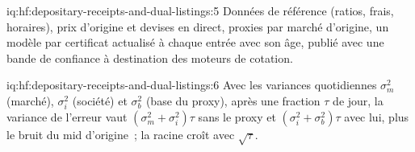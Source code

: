 \begin{solution}{iq:hf:depositary-receipts-and-dual-listings:5}
Données de référence (ratios, frais, horaires), prix d'origine et devises en direct, proxies par marché d'origine, un modèle par certificat actualisé à chaque entrée avec son
âge, publié avec une bande de confiance à destination des moteurs de cotation.
\end{solution}

\begin{solution}{iq:hf:depositary-receipts-and-dual-listings:6}
Avec les variances quotidiennes $\sigma_m^2$ (marché), $\sigma_i^2$ (société) et $\sigma_b^2$ (base du proxy), après une fraction $\tau$ de jour, la variance de l'erreur
vaut $(\sigma_m^2+\sigma_i^2)\tau$ sans le proxy et $(\sigma_i^2+\sigma_b^2)\tau$ avec lui, plus le bruit du mid d'origine~; la racine croît avec
$\sqrt\tau$.
\end{solution}
